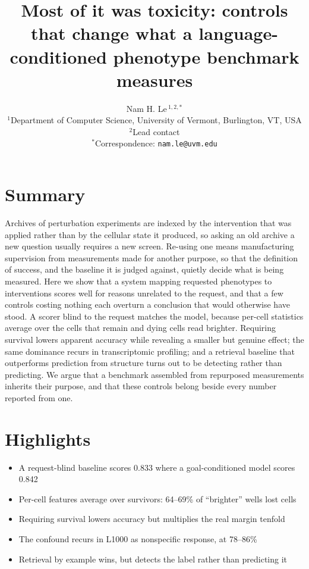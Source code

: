 \documentclass[11pt]{article}
\title{\vspace{-2em}\textbf{Most of it was toxicity: controls that change what a
language-conditioned phenotype benchmark measures}}
\author{Nam H. Le\,$^{1,2,*}$\\[0.4em]
\small $^{1}$Department of Computer Science, University of Vermont, Burlington, VT, USA\\
\small $^{2}$Lead contact\\
\small $^{*}$Correspondence: \texttt{nam.le@uvm.edu}}
\date{}
\begin{document}
\maketitle
\vspace{-2.5em}

\section*{Summary}

Archives of perturbation experiments are indexed by the intervention that was applied
rather than by the cellular state it produced, so asking an old archive a new question
usually requires a new screen. Re-using one means manufacturing supervision from
measurements made for another purpose, so that the definition of success, and the
baseline it is judged against, quietly decide what is being measured. Here we show that a
system mapping requested phenotypes to interventions scores well for reasons unrelated to
the request, and that a few controls costing nothing each overturn a conclusion that would
otherwise have stood. A scorer blind to the request matches the model, because per-cell
statistics average over the cells that remain and dying cells read brighter. Requiring
survival lowers apparent accuracy while revealing a smaller but genuine effect; the same
dominance recurs in transcriptomic profiling; and a retrieval baseline that outperforms
prediction from structure turns out to be detecting rather than predicting. We argue that
a benchmark assembled from repurposed measurements inherits their purpose, and that these
controls belong beside every number reported from one.

\section*{Highlights}
\begin{itemize}[leftmargin=1.2em,itemsep=0.15em]
\item A request-blind baseline scores 0.833 where a goal-conditioned model scores 0.842
\item Per-cell features average over survivors: 64--69\% of ``brighter'' wells lost cells
\item Requiring survival lowers accuracy but multiplies the real margin tenfold
\item The confound recurs in L1000 as nonspecific response, at 78--86\%
\item Retrieval by example wins, but detects the label rather than predicting it
\end{itemize}
\end{document}
